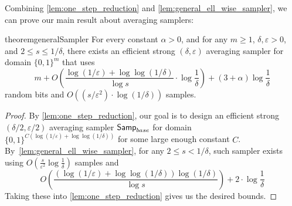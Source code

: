 \documentclass[11pt,letterpaper]{article}
\newcommand{\eps}{\varepsilon}
\newcommand{\1}{\mathbbm{1}}
\newcommand{\tuple}[1]{\left(#1\right)}
\newcommand{\zo}{\{0, 1\}}
\newcommand{\Smp}{\textup{\textsf{Samp}}}
\begin{document}





Combining \cref{lem:one_step_reduction} and \cref{lem:general_ell_wise_sampler}, we can prove our main result about averaging samplers:


\begin{restatable}{theorem}{generalSampler}
    \label{thm:general_sampler}
     For every constant $\alpha > 0$, and for any $m \ge 1$, $\delta, \eps > 0$, and  $2 \le s \le 1 / \delta$, there exists an efficient strong $(\delta, \eps)$ averaging sampler for domain $\zo^m$  that uses
    \[m + O\tuple{\frac{\log(1/\eps) + \log\log(1 / \delta)}{\log s} \cdot \log \frac{1}{\delta} } + (3 + \alpha) \log \frac{1}{\delta}\] random bits and $O( (s / \eps^2) \cdot \log (1 / \delta))$ samples.  
\end{restatable}



\begin{proof}
 By \cref{lem:one_step_reduction}, our goal is to design an efficient strong $(\delta / 2, \eps / 2)$ averaging sampler $\Smp_{base}$ for domain $\zo^{C(\log(1 / \eps) + \log\log (1 / \delta))}$ for some large enough constant $C$. By~\cref{lem:general_ell_wise_sampler}, for any $2 \le s < 1 / \delta$, such sampler exists using $O(\frac{s}{\eps^{2}}\log \frac{1}{\delta})$ samples and   
 \[
 O\tuple{\frac{(\log (1 / \eps) + \log\log(1 / \delta))\log(1 / \delta)}{\log s}} + 2 \cdot {\log \frac{1}{\delta}}
 \]
 Taking these into \cref{lem:one_step_reduction} gives us the desired bounds.
\end{proof}
\end{document}
